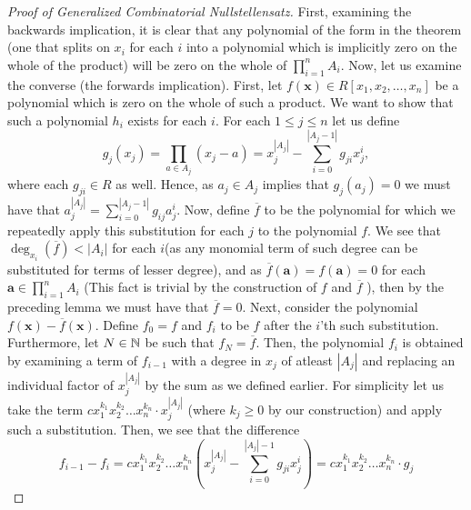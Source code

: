 	\begin{proof}[Proof of Generalized Combinatorial Nullstellensatz] First, examining the backwards implication, it is
		clear that any polynomial of the form in the theorem (one that
		splits on $x_{i}$ for each $i $ into a polynomial which is
		implicitly zero on the whole of the product) will be zero on
		the whole of $\prod_{i= 1}^{n} A_i $. Now, let us examine the
		converse (the forwards implication). First, let $f\left( \textbf{x} \right) \in R[x_1,
		x_2, \ldots, x_{n}]$ be a polynomial which is zero on the whole
		of such a product. We want to show that such a polynomial
		$h_i$ exists for each $i$.  For each $1\le j \le n$ let us
		define \begin{equation} g_j \left( x_j \right) = \prod_{a \in
	A_j}^{} \left( x_j - a \right) = x_{j}^{\left| A_j \right|} -
	\sum_{i=0}^{\left| A_j -1 \right| } g_{ji} x_j ^{ i} ,\end{equation}
	where each $g_{ji} \in R$ as well. Hence, as $a_j \in A_j$ implies that
$g_j\left( a_j \right) = 0$ we must have that $a_j ^{ \left| A_j \right| } =
\sum_{i=0}^{\left| A_j -1 \right| } g_{ij} a_j ^{ i}$. Now, define
$\overline{f}$ to be the polynomial for which we repeatedly apply this
substitution for each $j$ to the polynomial $f$. We see that $\deg _{x_{i}}
\left( \overline{f} \right) < \left| A_i \right| $ for each $i$(as any monomial term of such degree can be substituted for terms of lesser degree), and as
$\overline{f}\left( \textbf{a} \right)  = f\left( \textbf{a} \right) = 0$ for
each $ \textbf{a}\in \prod_{i= 1}^{n} A_i$ (This fact is trivial by the
construction of $f$ and $\overline{f}$ ), then by the preceding lemma we must
have that $\overline{f} = 0$.  Next, consider the polynomial $f\left(
\textbf{x} \right)  - \overline{f} \left( \textbf{x} \right) $. Define $f_0 =
f$ and $f_i$ to be $f$ after the $i $'th such substitution. Furthermore, let $N \in \mathbb{N}$ be such that  $f_N =
\overline{f}$. Then, the polynomial $f_i$ is obtained by examining a term of
$f_{i-1}$ with a degree in $x_{j}$ of atleast $\left| A_j \right| $ and
replacing an individual factor of $x_{j} ^{ \left| A_j \right| }$ by the sum as
we defined earlier. For simplicity let us take the term
$cx_1^{k_1}x_2^{k_2}\ldots x_{n}^{k_n} \cdot x_{j} ^{\left| A_j \right| }$
(where $k_j \ge 0$ by our construction) and apply such a substitution. Then, we
see that the difference \[f_{i-1} - f_i = cx_1^{k_1}x_2^{k_2}\ldots x_{n}^{
k_n} \left(x_{j}^{\left| A_j \right|}  - \sum_{i=0}^{\left| A_j \right| -1}
g_{ji} x_j ^{i}\right) = cx_1^{k_1}x_2^{k_2}\ldots x_{n}^{k_n} \cdot g_j
\]
\end{proof}
